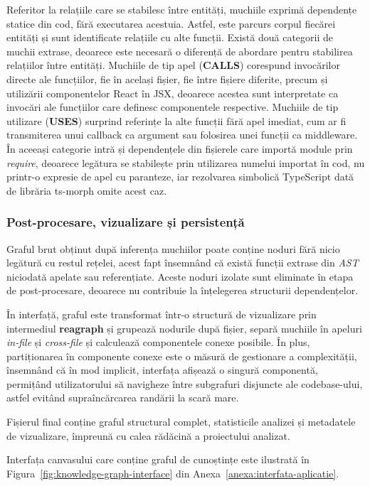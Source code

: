 \documentclass[12pt]{article}
\numberwithin{equation}{section}
\numberwithin{figure}{section}
\numberwithin{table}{section}
\theoremstyle{definition}
\theoremstyle{plain}
\newcounter{anexa}
\begin{document}
Referitor la relațiile care se stabilesc între entități, muchiile exprimă dependențe statice din cod, fără executarea acestuia. Astfel, este parcurs corpul fiecărei entități și sunt identificate relațiile cu alte funcții. Există două categorii de muchii extrase, deoarece este necesară o diferență de abordare pentru stabilirea relațiilor între entități. Muchiile de tip apel (\textbf{CALLS}) corespund invocărilor directe ale funcțiilor, fie în același fișier, fie între fișiere diferite, precum și utilizării componentelor React în JSX, deoarece acestea sunt interpretate ca invocări ale funcțiilor care definesc componentele respective. Muchiile de tip utilizare (\textbf{USES}) surprind referințe la alte funcții fără apel imediat, cum ar fi transmiterea unui callback ca argument sau folosirea unei funcții ca middleware. În aceeași categorie intră și dependențele din fișierele care importă module prin \textit{require}, deoarece legătura se stabilește prin utilizarea numelui importat în cod, nu printr-o expresie de apel cu paranteze, iar rezolvarea simbolică TypeScript dată de librăria ts-morph omite acest caz.

\subsubsection{Post-procesare, vizualizare și persistență}

Graful brut obținut după inferența muchiilor poate conține noduri fără nicio legătură cu restul rețelei, acest fapt însemnând că există funcții extrase din \textit{AST} niciodată apelate sau referențiate. Aceste noduri izolate sunt eliminate în etapa de post-procesare, deoarece nu contribuie la înțelegerea structurii dependențelor.

În interfață, graful este transformat într-o structură de vizualizare prin intermediul \textbf{reagraph} și grupează nodurile după fișier, separă muchiile în apeluri \textit{in-file} și \textit{cross-file} și calculează componentele conexe posibile. În plus, partiționarea în componente conexe este o măsură de gestionare a complexității, însemnând că în mod implicit, interfața afișează o singură componentă, permițând utilizatorului să navigheze între subgrafuri disjuncte ale codebase-ului, astfel evitând supraîncărcarea randării la scară mare.

Fișierul final conține graful structural complet, statisticile analizei și metadatele de vizualizare, împreună cu calea rădăcină a proiectului analizat.

Interfața canvasului care conține graful de cunoștințe este ilustrată în Figura~\ref{fig:knowledge-graph-interface} din Anexa~\ref{anexa:interfata-aplicatie}.
\end{document}
